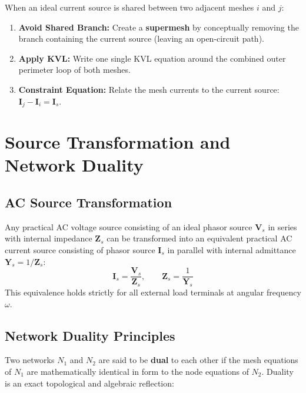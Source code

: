 \documentclass[12pt,a4paper]{article}
\begin{document}
\begin{tcolorbox}[defbox, title={\textbf{Supermesh Technique (Current Sources Shared Between Meshes)}}]
When an ideal current source is shared between two adjacent meshes $i$ and $j$:
\begin{enumerate}[leftmargin=*, itemsep=2pt, topsep=1pt]
  \item \textbf{Avoid Shared Branch:} Create a \textbf{supermesh} by conceptually removing the branch containing the current source (leaving an open-circuit path).
  \item \textbf{Apply KVL:} Write one single KVL equation around the combined outer perimeter loop of both meshes.
  \item \textbf{Constraint Equation:} Relate the mesh currents to the current source: $\mathbf{I}_j - \mathbf{I}_i = \mathbf{I}_s$.
\end{enumerate}
\end{tcolorbox}

\section{Source Transformation and Network Duality}

\subsection{AC Source Transformation}
Any practical AC voltage source consisting of an ideal phasor source $\mathbf{V}_s$ in series with internal impedance $\mathbf{Z}_s$ can be transformed into an equivalent practical AC current source consisting of phasor source $\mathbf{I}_s$ in parallel with internal admittance $\mathbf{Y}_s = 1/\mathbf{Z}_s$:
\begin{equation}
  \mathbf{I}_s = \frac{\mathbf{V}_s}{\mathbf{Z}_s}, \qquad \mathbf{Z}_s = \frac{1}{\mathbf{Y}_s}
\end{equation}
This equivalence holds strictly for all external load terminals at angular frequency $\omega$.

\subsection{Network Duality Principles}
Two networks $N_1$ and $N_2$ are said to be \textbf{dual} to each other if the mesh equations of $N_1$ are mathematically identical in form to the node equations of $N_2$. Duality is an exact topological and algebraic reflection:
\end{document}
